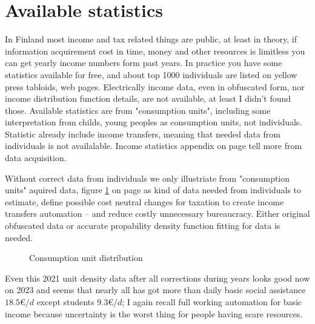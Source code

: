 \section{Available statistics}
\label{income tax statistics}
In Finland most income and tax related things are public, at least in theory,
if information acquirement cost in time, money and other resources
is limitless you can get yearly income numbers form past years.
In practice you have some statistics available for free,
and about top 1000 individuals are listed on yellow press tabloids,
web pages\cite{IncomeTaxSmoothness}.
Electrically income data, even in obfuscated form,
nor income distribution function details,
are not available, at least I didn't found those.
Available statistics are from "consumption units",
including some interpretation from childs,
young peoples as consumption units, not individuals\cite{ConsumptionUnitD}.
Statistic already include income transfers,
meaning that needed data from individuals is not availalable.
Income statistics appendix on page \pageref{statistics} tell more from data acquisition.

Without correct data from individuals we only illustriate from "consumption units"
aquired data, figure \ref{fig:ConsumptionUnit} on page \pageref{fig:ConsumptionUnit}
as kind of data needed from individuals to estimate,
define possible cost neutral chan\-ges for taxation to create income
transfers automation -- and reduce costly unnecessary bureaucracy.
Either original obfuscated data or accurate propability density function fitting for data is needed.

\begin{figure} %
 \begin{center}
  \caption{Consumption unit distribution}
  \label{fig:ConsumptionUnit} 
 \end{center}
\end{figure}

Even this 2021 unit density data after all corrections during years looks good now on 2023
and seems that nearly all has got more than daily basic social assistance
$18.5\euro/d$\cite{KELA_BASIC_ASSISTANCE}
except students $9.3\euro/d$\cite{KELA_StudyGrant};
I again recall full working automation for basic
income\cite{BasicIncomeInit}\-\cite{A2PalkkaerotIlta}
because uncertainty is the worst thing for people having scare resources.

